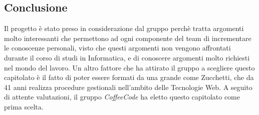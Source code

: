 \documentclass[../studio-di-fattibilita.tex]{subfiles}
\begin{document}
\subsection{Conclusione}%
\label{sub:conclusione}
Il progetto è stato preso in considerazione dal gruppo perchè tratta argomenti molto interessanti che permettono ad ogni componente del team di incrementare le conoscenze personali, visto che questi argomenti non vengono affrontati durante il corso di studi in Informatica, e di conoscere argomenti molto richiesti nel mondo del lavoro. Un altro fattore che ha attirato il gruppo a scegliere questo capitolato è il fatto di poter essere formati da una grande  come Zucchetti, che da 41 anni realizza procedure gestionali nell'ambito delle Tecnologie Web. A seguito di attente valutazioni, il gruppo \emph{CoffeeCode} ha eletto questo capitolato come prima scelta.
\end{document}
